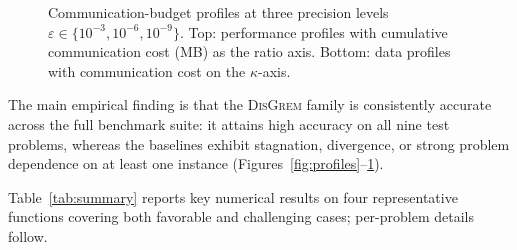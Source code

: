 \documentclass[review,onefignum,onetabnum]{siamart171218}
\begin{document}
	\begin{figure}[htbp]
		\centering
		\caption{Communication-budget profiles at three precision levels
			$\varepsilon\in\{10^{-3},10^{-6},10^{-9}\}$.
			Top: performance profiles with cumulative communication cost (MB)
			as the ratio axis.
			Bottom: data profiles with communication cost on the $\kappa$-axis.}
		\label{fig:profiles_comm}
	\end{figure}
	The main empirical finding is that the \textsc{DisGrem} family is
	consistently accurate across the full benchmark suite:
	it attains high accuracy on all nine test problems, whereas the
	baselines exhibit stagnation, divergence, or strong problem dependence
	on at least one instance
	(Figures~\ref{fig:profiles}--\ref{fig:profiles_comm}).
	
	Table~\ref{tab:summary} reports key numerical results on four
	representative functions covering both favorable and challenging
	cases; per-problem details follow.
	
\end{document}
